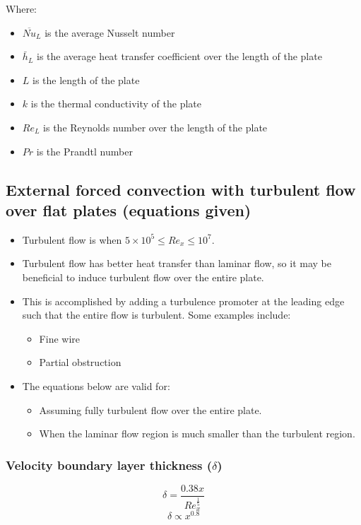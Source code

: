 \documentclass[11pt]{article}
\begin{document}
Where:
\begin{itemize}
\item \(\overline{Nu}_L\) is the average Nusselt number
\item \(\bar{h}_L\) is the average heat transfer coefficient over the length of the plate
\item \(L\) is the length of the plate
\item \(k\) is the thermal conductivity of the plate
\item \(Re_L\) is the Reynolds number over the length of the plate
\item \(Pr\) is the Prandtl number
\end{itemize}

\subsection{External forced convection with turbulent flow over flat plates (equations given)}
\label{sec:org9849982}
\begin{itemize}
\item Turbulent flow is when \(5 \times 10^5 \le Re_x \le 10^7\).
\item Turbulent flow has better heat transfer than laminar flow, so it may be beneficial to induce turbulent flow over the entire plate.
\item This is accomplished by adding a turbulence promoter at the leading edge such that the entire flow is turbulent. Some examples include:
\begin{itemize}
\item Fine wire
\item Partial obstruction
\end{itemize}
\item The equations below are valid for:
\begin{itemize}
\item Assuming fully turbulent flow over the entire plate.
\item When the laminar flow region is much smaller than the turbulent region.
\end{itemize}
\end{itemize}

\subsubsection{Velocity boundary layer thickness (\(\delta\))}
\label{sec:orga8ac616}
\[\delta = \frac{0.38 x}{Re_x^{\frac{1}{5}}}\]
\[\delta \propto x^{0.8}\]
\end{document}
